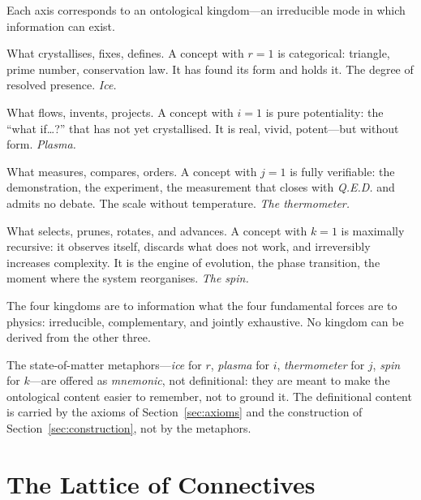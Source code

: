 \documentclass[11pt,a4paper]{article}
\newcommand{\rey}[1]{{\color{rcolor}#1}}
\newcommand{\imag}[1]{{\color{icolor}#1}}
\newcommand{\exac}[1]{{\color{jcolor}#1}}
\newcommand{\recu}[1]{{\color{kcolor}#1}}
\def\rey#1{#1}%
\def\imag#1{#1}%
\def\exac#1{#1}%
\def\recu#1{#1}%
\begin{document}
Each axis corresponds to an ontological kingdom---an irreducible mode in
which information can exist.

\begin{reinoR}
What crystallises, fixes, defines. A concept with $\rey{r}=1$ is
categorical: triangle, prime number, conservation law. It has found its
form and holds it. The degree of resolved presence.
\emph{Ice.}
\end{reinoR}

\begin{reinoI}
What flows, invents, projects. A concept with $\imag{i}=1$ is pure
potentiality: the ``what if\ldots?'' that has not yet crystallised.
It is real, vivid, potent---but without form.
\emph{Plasma.}
\end{reinoI}

\begin{reinoJ}
What measures, compares, orders. A concept with $\exac{j}=1$ is fully
verifiable: the demonstration, the experiment, the measurement that
closes with \textit{Q.E.D.} and admits no debate. The scale without
temperature.
\emph{The thermometer.}
\end{reinoJ}

\begin{reinoK}
What selects, prunes, rotates, and advances. A concept with $\recu{k}=1$
is maximally recursive: it observes itself, discards what does not work,
and irreversibly increases complexity. It is the engine of evolution, the
phase transition, the moment where the system reorganises.
\emph{The spin.}
\end{reinoK}

\bigskip

\noindent
The four kingdoms are to information what the four fundamental forces are
to physics: irreducible, complementary, and jointly exhaustive. No
kingdom can be derived from the other three.

The state-of-matter metaphors---\emph{ice} for $\rey{r}$, \emph{plasma}
for $\imag{i}$, \emph{thermometer} for $\exac{j}$, \emph{spin} for
$\recu{k}$---are offered as \emph{mnemonic}, not definitional: they are
meant to make the ontological content easier to remember, not to ground
it. The definitional content is carried by the axioms of
Section~\ref{sec:axioms} and the construction of
Section~\ref{sec:construction}, not by the metaphors.

\section{The Lattice of Connectives}
\label{sec:lattice}
\end{document}
